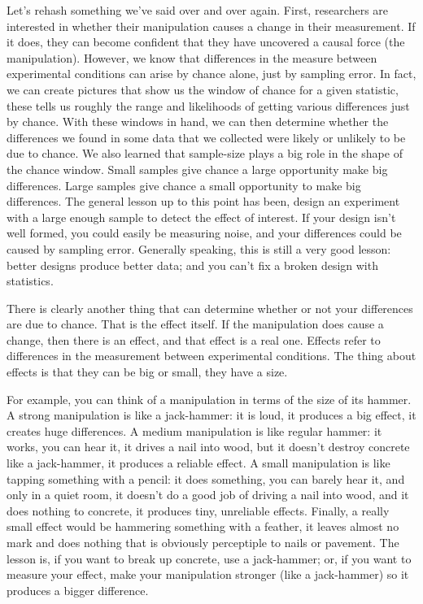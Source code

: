 \documentclass[
  letterpaper,
  DIV=11,
  numbers=noendperiod]{scrreprt}
\begin{document}
Let's rehash something we've said over and over again. First,
researchers are interested in whether their manipulation causes a change
in their measurement. If it does, they can become confident that they
have uncovered a causal force (the manipulation). However, we know that
differences in the measure between experimental conditions can arise by
chance alone, just by sampling error. In fact, we can create pictures
that show us the window of chance for a given statistic, these tells us
roughly the range and likelihoods of getting various differences just by
chance. With these windows in hand, we can then determine whether the
differences we found in some data that we collected were likely or
unlikely to be due to chance. We also learned that sample-size plays a
big role in the shape of the chance window. Small samples give chance a
large opportunity make big differences. Large samples give chance a
small opportunity to make big differences. The general lesson up to this
point has been, design an experiment with a large enough sample to
detect the effect of interest. If your design isn't well formed, you
could easily be measuring noise, and your differences could be caused by
sampling error. Generally speaking, this is still a very good lesson:
better designs produce better data; and you can't fix a broken design
with statistics.

There is clearly another thing that can determine whether or not your
differences are due to chance. That is the effect itself. If the
manipulation does cause a change, then there is an effect, and that
effect is a real one. Effects refer to differences in the measurement
between experimental conditions. The thing about effects is that they
can be big or small, they have a size.

For example, you can think of a manipulation in terms of the size of its
hammer. A strong manipulation is like a jack-hammer: it is loud, it
produces a big effect, it creates huge differences. A medium
manipulation is like regular hammer: it works, you can hear it, it
drives a nail into wood, but it doesn't destroy concrete like a
jack-hammer, it produces a reliable effect. A small manipulation is like
tapping something with a pencil: it does something, you can barely hear
it, and only in a quiet room, it doesn't do a good job of driving a nail
into wood, and it does nothing to concrete, it produces tiny, unreliable
effects. Finally, a really small effect would be hammering something
with a feather, it leaves almost no mark and does nothing that is
obviously perceptiple to nails or pavement. The lesson is, if you want
to break up concrete, use a jack-hammer; or, if you want to measure your
effect, make your manipulation stronger (like a jack-hammer) so it
produces a bigger difference.
\end{document}
